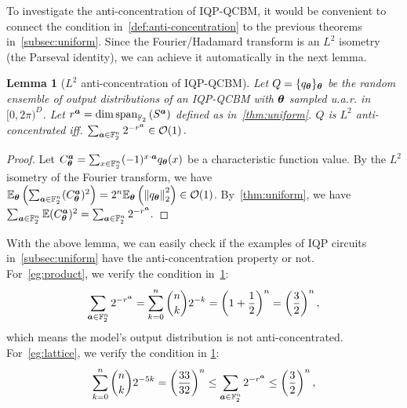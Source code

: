 \documentclass{article}
\theoremstyle{plain}
\newtheorem{lemma}[theorem]{Lemma}
\theoremstyle{definition}
\theoremstyle{remark}
\begin{document}
To investigate the anti-concentration of IQP-QCBM, it would be convenient to connect the condition in~\cref{def:anti-concentration} to the previous theorems in~\cref{subsec:uniform}. Since the Fourier/Hadamard transform is an $L^2$ isometry (the Parseval identity), we can achieve it automatically in the next lemma.
\begin{lemma}[$L^2$ anti-concentration of IQP-QCBM]
\label{lem:parseval} Let $Q = \{q_{\bm{\theta}}\}_{\bm{\theta}}$ be the random ensemble of output distributions of an IQP-QCBM with ${\bm{\theta}}$ sampled u.a.r. in $[0,2\pi)^D$. Let $r^{\bm{a}} = \dim\operatorname{span}_{\mathbb{F}_2}\left( S^{{\bm{a}}} \right)$ defined as in~\cref{thm:uniform}. $Q$ is $L^2$ anti-concentrated iff. $\sum_{{\bm{a}}\in\mathbb{F}_2^n}2^{-r^{\bm{a}}} \in \mathcal{O}(1)\,.$
\end{lemma}
\begin{proof}
    Let $C^{\bm{a}}_{\bm{\theta}} = \sum_{x\in \mathbb{F}_2^n} (-1)^{x\cdot {\bm{a}}}q_{\bm{\theta}}(x)$ be a characteristic function value.
    By the $L^2$ isometry of the Fourier transform, we have $\mathbb{E}_{\bm{\theta}}\left(\sum_{{\bm{a}}\in \mathbb{F}_2^n}(C^{\bm{a}}_{\bm{\theta}})^2\right)=2^n\mathbb{E}_{\bm{\theta}}\left(\norm{q_{\bm{\theta}}}^2_2\right)\in\mathcal{O}(1)$. By~\cref{thm:uniform}, we have $\sum_{{\bm{a}}\in \mathbb{F}_2^n}\mathbb{E}(C^{\bm{a}}_{\bm{\theta}})^2=\sum_{{\bm{a}}\in\mathbb{F}_2^n}2^{-r^{\bm{a}}}.$
\end{proof}
With the above lemma, we can easily check if the examples of IQP circuits in~\cref{subsec:uniform} have the anti-concentration property or not. \\
For~\cref{eg:product}, we verify the condition in~\cref{lem:parseval}:
\begin{equation*}
\sum_{{\bm{a}} \in \mathbb{F}_2^n}  2^{-r^{\bm{a}}}=\sum_{k=0}^n \binom{n}{k}2^{-k}=\left(1+\frac12\right)^n=\left(\frac32\right)^n,
\end{equation*}
which means the model's output distribution is not anti-concentrated.\\
For~\cref{eg:lattice}, we verify the condition in \cref{lem:parseval}: 
\begin{equation*}
\sum_{k=0}^n \binom{n}{k}2^{-5k}=\left(\frac{33}{32}\right)^n
\leq
\sum_{{\bm{a}} \in \mathbb{F}_2^n} 2^{-r^{\bm{a}}}
\leq
\left(\frac32\right)^n,
\end{equation*}
\end{document}
